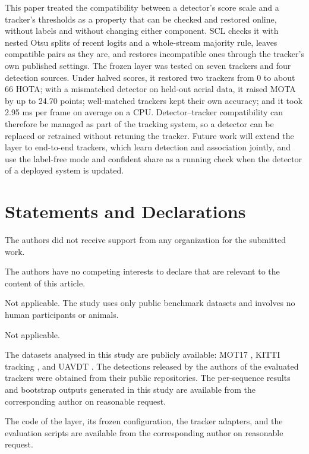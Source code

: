 \documentclass[pdflatex,sn-mathphys-num,iicol]{sn-jnl}
\newcommand{\scl}{SCL}
\def\anonymousversion{}
\begin{document}
This paper treated the compatibility between a detector's score scale and a tracker's thresholds
as a property that can be checked and restored online, without labels and without changing either
component. \scl{} checks it with nested Otsu splits of recent logits and a whole-stream majority
rule, leaves compatible pairs as they are, and restores incompatible ones through the tracker's own
published settings. The frozen layer was tested on seven trackers and four
detection sources. Under halved scores, it restored two trackers from 0 to about 66 HOTA; with a
mismatched detector on held-out aerial data, it raised MOTA by up to 24.70 points; well-matched
trackers kept their own accuracy; and it took 2.95 ms per frame on average on a CPU.
Detector--tracker compatibility can therefore be managed as part of the tracking system, so a
detector can be replaced or retrained without retuning the tracker. Future work will extend the
layer to end-to-end trackers, which learn detection and association jointly, and use the label-free
mode and confident share as a running check when the detector of a deployed system is updated.

\FloatBarrier
\backmatter

\section*{Statements and Declarations}

The authors did not receive support from any organization for the submitted work.

The authors have no competing interests to declare that are relevant to the content of this
article.

Not applicable. The study uses only public benchmark datasets and involves no human participants
or animals.

Not applicable.

The datasets analysed in this study are publicly available: MOT17 \cite{milan2016mot16}, KITTI
tracking \cite{geiger2012kitti}, and UAVDT \cite{du2018uavdt}. The detections released by the
authors of the evaluated trackers were obtained from their public repositories. The per-sequence
results and bootstrap outputs generated in this study are available from the corresponding author
on reasonable request.

The code of the layer, its frozen configuration, the tracker adapters, and the evaluation scripts
are available from the corresponding author on reasonable request.
\ifdefined\anonymousversion\else
\end{document}
